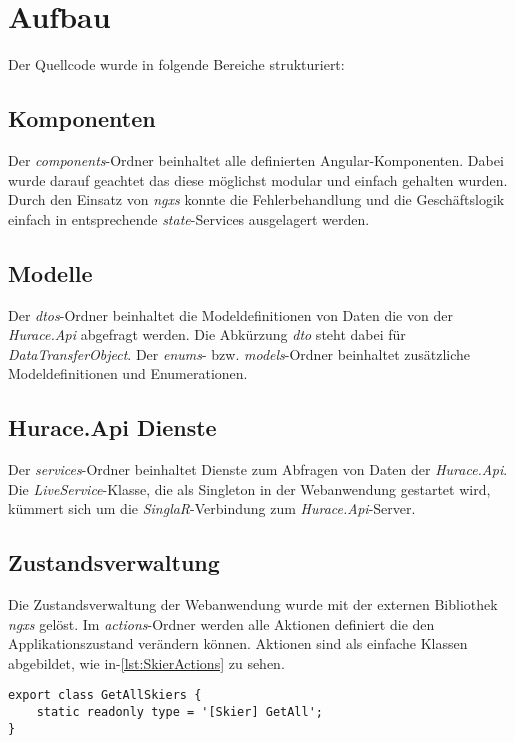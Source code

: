 \chapter{Aufbau}
Der Quellcode wurde in folgende Bereiche strukturiert:

\section{Komponenten}
Der \emph{components}-Ordner beinhaltet alle definierten Angular-Komponenten.
Dabei wurde darauf geachtet das diese möglichst modular und einfach gehalten wurden.
Durch den Einsatz von \emph{ngxs} konnte die Fehlerbehandlung und die Geschäftslogik einfach in entsprechende \emph{state}-Services ausgelagert werden.

\section{Modelle}
Der \emph{dtos}-Ordner beinhaltet die Modeldefinitionen von Daten die von der \emph{Hurace.Api} abgefragt werden.
Die Abkürzung \emph{dto} steht dabei für \emph{DataTransferObject}.
Der \emph{enums}- bzw. \emph{models}-Ordner beinhaltet zusätzliche Modeldefinitionen und Enumerationen.

\section{Hurace.Api Dienste}
Der \emph{services}-Ordner beinhaltet Dienste zum Abfragen von Daten der \emph{Hurace.Api}.
Die \emph{LiveService}-Klasse, die als Singleton in der Webanwendung gestartet wird, kümmert sich um die \emph{SinglaR}-Verbindung zum \emph{Hurace.Api}-Server.

\section{Zustandsverwaltung}
Die Zustandsverwaltung der Webanwendung wurde mit der externen Bibliothek \emph{ngxs} gelöst.
Im \emph{actions}-Ordner werden alle Aktionen definiert die den Applikationszustand verändern können.
Aktionen sind als einfache Klassen abgebildet, wie in-\cref{lst:SkierActions} zu sehen.

\begin{lstlisting}[caption={Definieren einer Aktion}, label=lst:SkierActions]
export class GetAllSkiers {
    static readonly type = '[Skier] GetAll';
}
\end{lstlisting}

